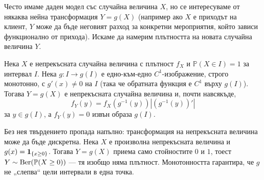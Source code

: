 Често имаме даден модел със случайна величина $X$, но се интересуваме от някаква нейна трансформация $Y = g(X)$ (например ако $X$ е приходът на клиент, $Y$ може да бъде неговият разход за конкретни мероприятия, който зависи функционално от прихода). Искаме да намерим плътността на новата случайна величина $Y$.

\begin{thm}
Нека $X$ е непрекъсната случайна величина с плътност $f_X$ и $\mathbb{P}(X\in I)=1$ за интервал $I$. Нека $g:I\to g(I)$ е едно-към-едно $C^1$-изображение, строго монотонно, с $g'(x)\ne0$ на $I$ (така че обратната функция е $C^1$ върху $g(I)$). Тогава $Y=g(X)$ е непрекъсната случайна величина и, почти навсякъде,
\[
f_Y(y) = f_X(g^{-1}(y)) \left| (g^{-1}(y))' \right|
\]
за $y\in g(I)$, а $f_Y(y)=0$ извън образа $g(I)$.
\end{thm}

\begin{supp}\label{supp:monotone-needed}
Без нея твърдението пропада напълно: трансформация на непрекъсната величина може да бъде
дискретна. Нека $X$ е произволна непрекъсната величина и $g(x) = \mathbf{1}_{\{x \ge 0\}}$. Тогава
$Y = g(X)$ приема само стойностите $0$ и $1$, тоест $Y \sim \operatorname{Ber}(\mathbb{P}(X \ge 0))$ — тя
изобщо няма плътност. Монотонността гарантира, че $g$ не „слепва“ цели интервали в една
точка.
\end{supp}

